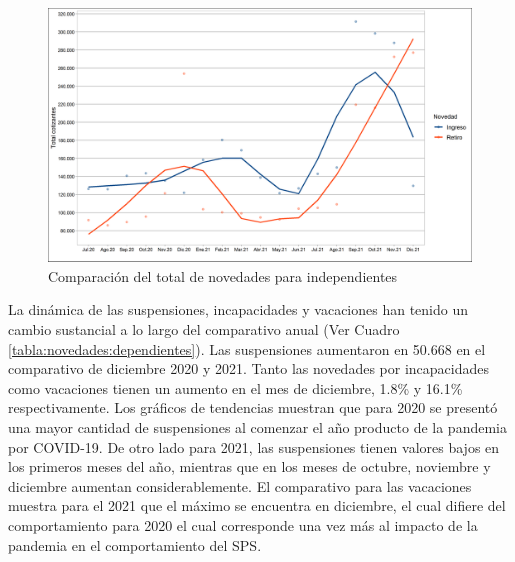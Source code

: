 \begin{figure}
\includegraphics[width = 11.5cm]{figures/01_dinamica/total_novedades_independientes_ingret.png}
\caption{Comparación del total de novedades para independientes}
\label{figura:novedad:indpependientes:IR}
\end{figure}

La dinámica de las suspensiones, incapacidades y vacaciones han tenido un cambio sustancial a lo largo del comparativo anual (Ver Cuadro \ref{tabla:novedades:dependientes}). Las suspensiones aumentaron en 50.668 en el comparativo de diciembre 2020 y 2021. Tanto las novedades por incapacidades como vacaciones tienen un aumento en el mes de diciembre, 1.8\% y 16.1\% respectivamente. Los gráficos de tendencias muestran que para 2020 se presentó una mayor cantidad de suspensiones al comenzar el año producto de la pandemia por COVID-19. De otro lado para 2021, las suspensiones tienen valores bajos en los primeros meses del año, mientras que en los meses de octubre, noviembre y diciembre aumentan considerablemente. El comparativo para las vacaciones muestra para el 2021 que el máximo se encuentra en diciembre, el cual difiere del comportamiento para 2020 el cual corresponde una vez más al impacto de la pandemia en el comportamiento del SPS.



